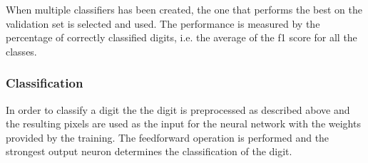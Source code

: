 \documentclass[report.tex]{subfile}
\begin{document}
When multiple classifiers has been created, the one that performs the best on
the validation set is selected and used. The performance is measured by the
percentage of correctly classified digits, i.e. the average of the f1 score for
all the classes.

\subsubsection{Classification}
In order to classify a digit the the digit is preprocessed as described above
and the resulting pixels are used as the input for the neural network with the
weights provided by the training. The feedforward operation is performed and
the strongest output neuron determines the classification of the digit.
\end{document}

